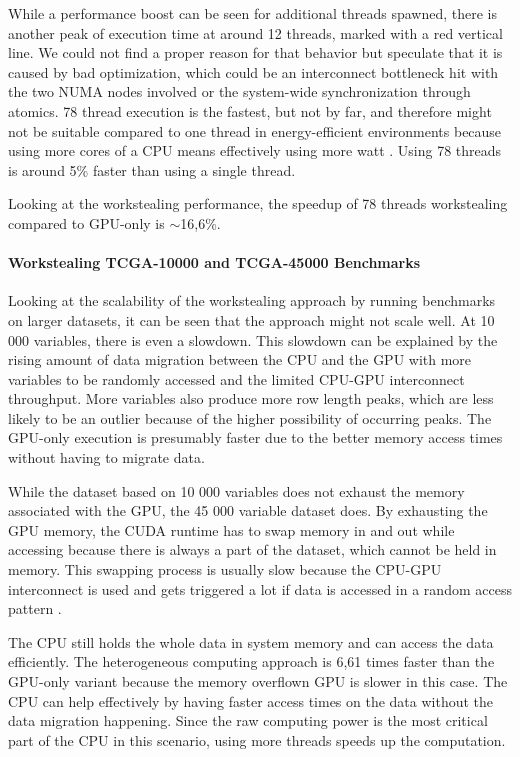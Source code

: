 While a performance boost can be seen for additional threads spawned, there is another peak of execution time at around 12 threads, marked with a red vertical line. We could not find a proper reason for that behavior but speculate that it is caused by bad optimization, which could be an interconnect bottleneck hit with the two NUMA nodes involved or the system-wide synchronization through atomics. 78 thread execution is the fastest, but not by far, and therefore might not be suitable compared to one thread in energy-efficient environments because using more cores of a CPU means effectively using more watt \cite{saravananStudyFactorsInfluencing2011}. Using 78 threads is around 5\% faster than using a single thread.

Looking at the workstealing performance, the speedup of 78 threads workstealing compared to GPU-only is $\sim$16,6\%.

\paragraph{Workstealing TCGA-10000 and TCGA-45000 Benchmarks}


Looking at the scalability of the workstealing approach by running benchmarks on larger datasets, it can be seen that the approach might not scale well. At 10 000 variables, there is even a slowdown. This slowdown can be explained by the rising amount of data migration between the CPU and the GPU with more variables to be randomly accessed and the limited CPU-GPU interconnect throughput. More variables also produce more row length peaks, which are less likely to be an outlier because of the higher possibility of occurring peaks.
The GPU-only execution is presumably faster due to the better memory access times without having to migrate data.

While the dataset based on 10 000 variables does not exhaust the memory associated with the GPU, the 45 000 variable dataset does. By exhausting the GPU memory, the CUDA runtime has to swap memory in and out while accessing because there is always a part of the dataset, which cannot be held in memory. This swapping process is usually slow because the CPU-GPU interconnect is used and gets triggered a lot if data is accessed in a random access pattern \cite{gangulyAdaptivePageMigration2020, kimBatchAwareUnifiedMemory2020}.

The CPU still holds the whole data in system memory and can access the data efficiently. The heterogeneous computing approach is 6,61 times faster than the GPU-only variant because the memory overflown GPU is slower in this case. The CPU can help effectively by having faster access times on the data without the data migration happening.
Since the raw computing power is the most critical part of the CPU in this scenario, using more threads speeds up the computation.

